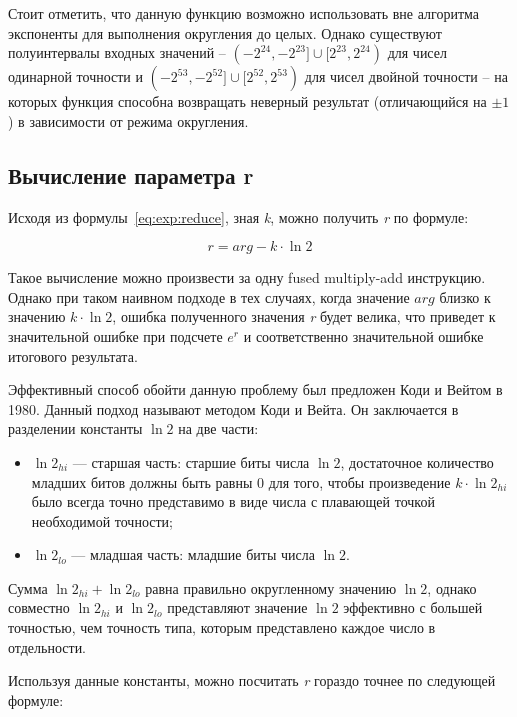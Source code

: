 Стоит отметить, что данную функцию возможно использовать вне алгоритма экспоненты для выполнения округления до целых.
Однако существуют полуинтервалы входных значений -- $(-2^{24}, -2^{23}] \cup [2^{23}, 2^{24})$ для чисел одинарной точности и $(-2^{53}, -2^{52}] \cup [2^{52}, 2^{53})$ для чисел двойной точности -- на которых функция способна возвращать неверный результат (отличающийся на $\pm1$) в зависимости от режима округления.

\subsection{Вычисление параметра r}

Исходя из формулы~\ref{eq:exp:reduce}, зная \textit{k}, можно получить \textit{r} по формуле:

\begin{equation}
    r = arg - k \cdot \ln{2}
\end{equation}

Такое вычисление можно произвести за одну \foreignlanguage{english}{fused multiply-add} инструкцию.
Однако при таком наивном подходе в тех случаях, когда значение $arg$ близко к значению $k \cdot \ln{2}$, ошибка полученного значения \textit{r} будет велика, что приведет к значительной ошибке при подсчете $e^{r}$ и соответственно значительной ошибке итогового результата.

Эффективный способ обойти данную проблему был предложен Коди и Вейтом в 1980\cite{cody-waite}.
Данный подход называют методом Коди и Вейта.
Он заключается в разделении константы $\ln{2}$ на две части:

\begin{itemize}
    \item $\ln{2}_{hi}$ --- старшая часть: старшие биты числа $\ln{2}$, достаточное количество младших битов должны быть равны 0 для того, чтобы произведение $k \cdot \ln{2}_{hi}$ было всегда точно представимо в виде числа с плавающей точкой необходимой точности;
    \item $\ln{2}_{lo}$ --- младшая часть: младшие биты числа $\ln{2}$.
\end{itemize}

Сумма $\ln{2}_{hi} + \ln{2}_{lo}$ равна правильно округленному значению $\ln{2}$, однако совместно $\ln{2}_{hi}$ и $\ln{2}_{lo}$ представляют значение $\ln{2}$ эффективно с большей точностью, чем точность типа, которым представлено каждое число в отдельности.

Используя данные константы, можно посчитать \textit{r} гораздо точнее по следующей формуле:


